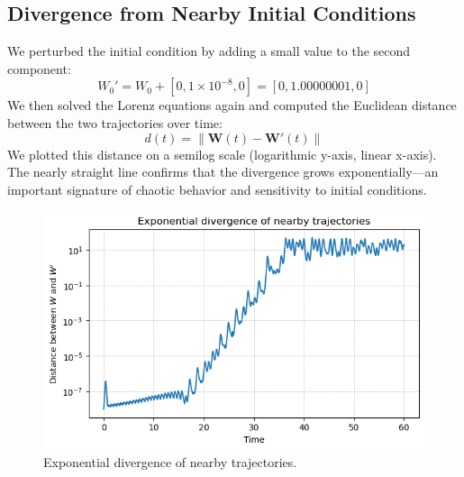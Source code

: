 \documentclass[12pt]{article}
\begin{document}
\subsection*{Divergence from Nearby Initial Conditions}
We perturbed the initial condition by adding a small value to the second component:
\[
W_0' = W_0 + [0, 1 \times 10^{-8}, 0] = [0, 1.00000001, 0]
\]
We then solved the Lorenz equations again and computed the Euclidean distance between the two trajectories over time:
\[
d(t) = \left\| \mathbf{W}(t) - \mathbf{W}'(t) \right\|
\]
We plotted this distance on a semilog scale (logarithmic y-axis, linear x-axis). The nearly straight line confirms that the divergence grows exponentially—an important signature of chaotic behavior and sensitivity to initial conditions.

\begin{figure}[H]
    \centering
    \includegraphics[width= 1 \textwidth]{download (2).png}
    \caption{Exponential divergence of nearby trajectories.}
\end{figure}

\clearpage
\end{document}
